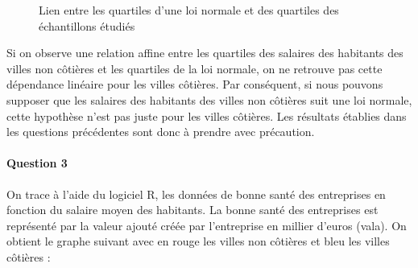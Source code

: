 \documentclass[oneside,a4paper,13pt]{book}
\begin{document}
\begin{figure}[H]
  \centering
  \hfill
  \caption{Lien entre les quartiles d'une loi normale et des quartiles des échantillons étudiés}
\end{figure}

Si on observe une relation affine entre les quartiles des salaires des habitants des villes non côtières et les quartiles de la loi normale, on ne retrouve pas cette dépendance linéaire pour les villes côtières. Par conséquent, si nous pouvons supposer que les salaires des habitants des villes non côtières suit une loi normale, cette hypothèse n'est pas juste pour les villes côtières. Les résultats établies dans les questions précédentes sont donc à prendre avec précaution. 

\paragraph{Question 3}
On trace à l'aide du logiciel R, les données de bonne santé des entreprises en fonction du salaire moyen des habitants. La bonne santé des entreprises est représenté par la valeur ajouté créée par l'entreprise en millier d'euros (vala). On obtient le graphe suivant avec en rouge les villes non côtières et bleu les villes côtières  :
 
\end{document}
